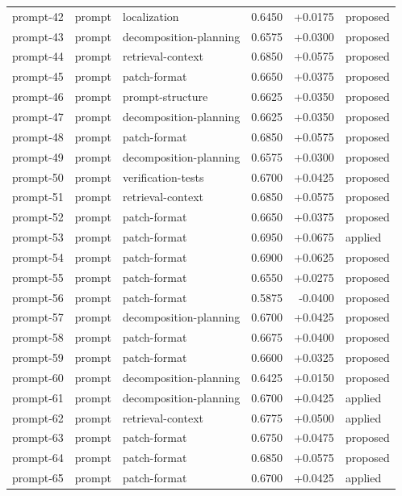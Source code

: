 \begin{center}
\begin{longtable}{llp{5.2cm}rrl}
prompt-42 & prompt & localization & 0.6450 & +0.0175 & proposed \\
prompt-43 & prompt & decomposition-planning & 0.6575 & +0.0300 & proposed \\
prompt-44 & prompt & retrieval-context & 0.6850 & +0.0575 & proposed \\
prompt-45 & prompt & patch-format & 0.6650 & +0.0375 & proposed \\
prompt-46 & prompt & prompt-structure & 0.6625 & +0.0350 & proposed \\
prompt-47 & prompt & decomposition-planning & 0.6625 & +0.0350 & proposed \\
prompt-48 & prompt & patch-format & 0.6850 & +0.0575 & proposed \\
prompt-49 & prompt & decomposition-planning & 0.6575 & +0.0300 & proposed \\
prompt-50 & prompt & verification-tests & 0.6700 & +0.0425 & proposed \\
prompt-51 & prompt & retrieval-context & 0.6850 & +0.0575 & proposed \\
prompt-52 & prompt & patch-format & 0.6650 & +0.0375 & proposed \\
prompt-53 & prompt & patch-format & 0.6950 & +0.0675 & applied \\
prompt-54 & prompt & patch-format & 0.6900 & +0.0625 & proposed \\
prompt-55 & prompt & patch-format & 0.6550 & +0.0275 & proposed \\
prompt-56 & prompt & patch-format & 0.5875 & -0.0400 & proposed \\
prompt-57 & prompt & decomposition-planning & 0.6700 & +0.0425 & proposed \\
prompt-58 & prompt & patch-format & 0.6675 & +0.0400 & proposed \\
prompt-59 & prompt & patch-format & 0.6600 & +0.0325 & proposed \\
prompt-60 & prompt & decomposition-planning & 0.6425 & +0.0150 & proposed \\
prompt-61 & prompt & decomposition-planning & 0.6700 & +0.0425 & applied \\
prompt-62 & prompt & retrieval-context & 0.6775 & +0.0500 & applied \\
prompt-63 & prompt & patch-format & 0.6750 & +0.0475 & proposed \\
prompt-64 & prompt & patch-format & 0.6850 & +0.0575 & proposed \\
prompt-65 & prompt & patch-format & 0.6700 & +0.0425 & applied \\

\end{longtable}
\end{center}
